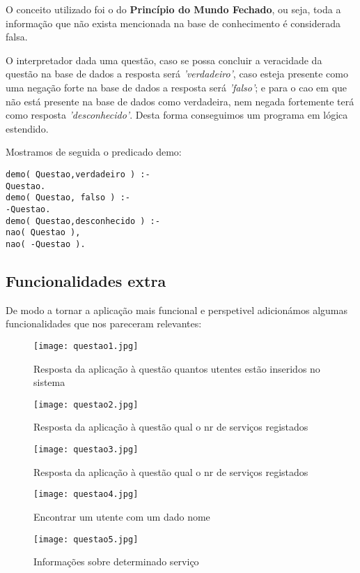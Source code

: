 O conceito utilizado foi o do \textbf{Princípio do Mundo Fechado}, ou seja, toda a informação que não exista mencionada na base de conhecimento é considerada falsa. 

O interpretador dada uma questão, caso se possa concluir a veracidade da questão na base de dados a resposta será \textit{'verdadeiro'}, caso esteja presente como uma negação forte na base de dados a resposta será \textit{'falso'}; e para o cao em que não está presente na base de dados como verdadeira, nem negada fortemente terá como resposta \textit{'desconhecido'}. Desta forma conseguimos um programa em lógica estendido. 

Mostramos de seguida o predicado demo: 
\begin{verbatim}
demo( Questao,verdadeiro ) :-
Questao.
demo( Questao, falso ) :-
-Questao.
demo( Questao,desconhecido ) :-
nao( Questao ),
nao( -Questao ).
\end{verbatim}

\subsection{Funcionalidades extra}
De modo a tornar a aplicação mais funcional e perspetivel adicionámos algumas funcionalidades que nos pareceram relevantes: 

\begin{figure}[<+htb+>]
	\centering
	\texttt{[image: questao1.jpg]}
	\caption{Resposta da aplicação à questão quantos utentes estão inseridos no sistema}
\end{figure}

\begin{figure}[<+htb+>]
	\centering
	\texttt{[image: questao2.jpg]}
	\caption{Resposta da aplicação à questão qual o nr de serviços registados}
\end{figure}

\begin{figure}[<+htb+>]
	\centering
	\texttt{[image: questao3.jpg]}
	\caption{Resposta da aplicação à questão qual o nr de serviços registados}
\end{figure}

\begin{figure}[<+ht+>]
	\centering
	\texttt{[image: questao4.jpg]}
	\caption{Encontrar um utente com um dado nome }
\end{figure}


\begin{figure}[<+ht+>]
	\centering
	\texttt{[image: questao5.jpg]}
	\caption{Informações sobre determinado serviço}
\end{figure}


